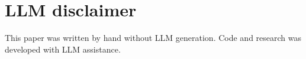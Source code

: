 \documentclass[11pt, a4paper]{article}
\begin{document}
\section{LLM disclaimer}

This paper was written by hand without LLM generation. Code and research was developed with LLM assistance.

 
 
\end{document}
